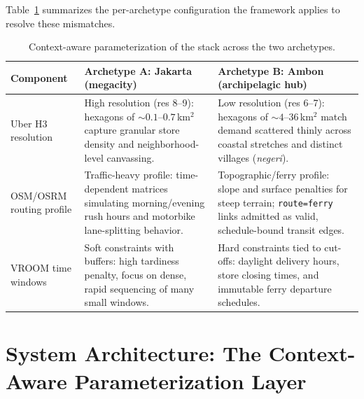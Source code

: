 \documentclass[11pt,a4paper,twocolumn]{article}
\begin{document}
Table~\ref{tab:parameterization} summarizes the per-archetype
configuration the framework applies to resolve these mismatches.

\begin{table}[t]
  \centering
  \small
  \caption{Context-aware parameterization of the stack across the two
    archetypes.}
  \label{tab:parameterization}
  \begin{tabular}{@{}p{2.6cm}p{6.4cm}p{6.4cm}@{}}
    \toprule
    \textbf{Component} & \textbf{Archetype A: Jakarta (megacity)} &
      \textbf{Archetype B: Ambon (archipelagic hub)} \\
    \midrule
    Uber H3 resolution &
      High resolution (res 8--9): hexagons of ${\sim}0.1$--$0.7$\,km$^2$
      capture granular store density and neighborhood-level canvassing. &
      Low resolution (res 6--7): hexagons of ${\sim}4$--$36$\,km$^2$ match
      demand scattered thinly across coastal stretches and distinct
      villages (\emph{negeri}). \\
    \addlinespace[0.35em]
    OSM/OSRM routing profile &
      Traffic-heavy profile: time-dependent matrices simulating
      morning/evening rush hours and motorbike lane-splitting behavior. &
      Topographic/ferry profile: slope and surface penalties for steep
      terrain; \texttt{route=ferry} links admitted as valid, schedule-bound
      transit edges. \\
    \addlinespace[0.35em]
    VROOM time windows &
      Soft constraints with buffers: high tardiness penalty, focus on
      dense, rapid sequencing of many small windows. &
      Hard constraints tied to cut-offs: daylight delivery hours, store
      closing times, and immutable ferry departure schedules. \\
    \bottomrule
  \end{tabular}
\end{table}

\section{System Architecture: The Context-Aware Parameterization Layer}
\label{sec:architecture}
\end{document}
